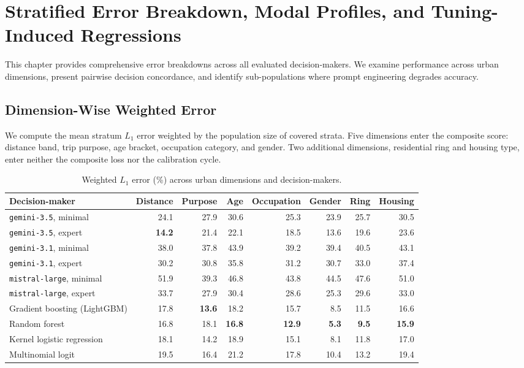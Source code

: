 \section{Stratified Error Breakdown, Modal Profiles, and Tuning-Induced Regressions}
\label{app-stratified}

This chapter provides comprehensive error breakdowns across all evaluated decision-makers. We examine performance across urban dimensions, present pairwise decision concordance, and identify sub-populations where prompt engineering degrades accuracy.

\subsection{Dimension-Wise Weighted Error}

We compute the mean stratum $L_1$ error weighted by the population size of covered strata. Five dimensions enter the composite score: distance band, trip purpose, age bracket, occupation category, and gender. Two additional dimensions, residential ring and housing type, enter neither the composite loss nor the calibration cycle.

\begin{table}[tp]
  \caption{Weighted $L_1$ error (\%) across urban dimensions and decision-makers.}
  \label{tab-dimensions-full}
  \begin{tabular}{lrrrrrrr}
    \toprule
    Decision-maker & Distance & Purpose & Age & Occupation & Gender & Ring & Housing \\
    \midrule
    \texttt{gemini-3.5}, minimal    & 24.1 & 27.9 & 30.6 & 25.3 & 23.9 & 25.7 & 30.5 \\
    \texttt{gemini-3.5}, expert     & \textbf{14.2} & 21.4 & 22.1 & 18.5 & 13.6 & 19.6 & 23.6 \\
    \texttt{gemini-3.1}, minimal    & 38.0 & 37.8 & 43.9 & 39.2 & 39.4 & 40.5 & 43.1 \\
    \texttt{gemini-3.1}, expert     & 30.2 & 30.8 & 35.8 & 31.2 & 30.7 & 33.0 & 37.4 \\
    \texttt{mistral-large}, minimal & 51.9 & 39.3 & 46.8 & 43.8 & 44.5 & 47.6 & 51.0 \\
    \texttt{mistral-large}, expert  & 33.7 & 27.9 & 30.4 & 28.6 & 25.3 & 29.6 & 33.0 \\
    \midrule
    Gradient boosting (LightGBM)    & 17.8 & \textbf{13.6} & 18.2 & 15.7 & 8.5 & 11.5 & 16.6 \\
    Random forest                   & 16.8 & 18.1 & \textbf{16.8} & \textbf{12.9} & \textbf{5.3} & \textbf{9.5} & \textbf{15.9} \\
    Kernel logistic regression     & 18.1 & 14.2 & 18.9 & 15.1 & 8.1 & 11.8 & 17.0 \\
    Multinomial logit               & 19.5 & 16.4 & 21.2 & 17.8 & 10.4 & 13.2 & 19.4 \\
    \bottomrule
  \end{tabular}
\end{table}

